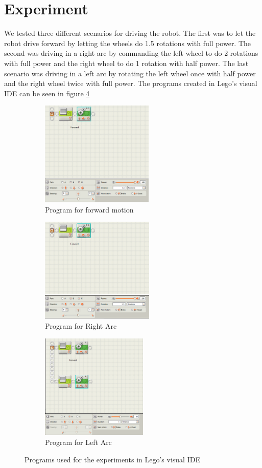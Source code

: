 \documentclass[paper=a4, fontsize=11pt]{scrartcl} %
\numberwithin{equation}{section} %
\numberwithin{figure}{section} %
\numberwithin{table}{section} %
\begin{document}
\section{Experiment}
We tested three different scenarios for driving the robot.
The first was to let the robot drive forward by letting the wheels do 1.5 rotations with full power.
The second was driving in a right arc by commanding the left wheel to do 2 rotations with full power and the right wheel to do 1 rotation with half power.
The last scenario was driving in a left arc by rotating the left wheel once with half power and the right wheel twice with full power.
The programs created in Lego's visual IDE can be seen in figure \ref{fig:code}

\begin{figure}[H]
 
\begin{subfigure}{0.5\textwidth}
\includegraphics[width=0.9\linewidth, height=5cm]{forward_code.PNG} 
\caption{Program for forward motion}
\label{fig:sub_forward_code}
\end{subfigure}
\begin{subfigure}{0.5\textwidth}
\includegraphics[width=0.9\linewidth, height=5cm]{right_arc_code.PNG}
\caption{Program for Right Arc}
\label{fig:sub_right_code}
\end{subfigure}
\begin{subfigure}{0.5\textwidth}
\includegraphics[width=0.9\linewidth, height=5cm]{left_arc_code.PNG}
\caption{Program for Left Arc}
\label{fig:sub_left_code}
\end{subfigure}
 
\caption{Programs used for the experiments in Lego's visual IDE}
\label{fig:code}
\end{figure}
\end{document}
